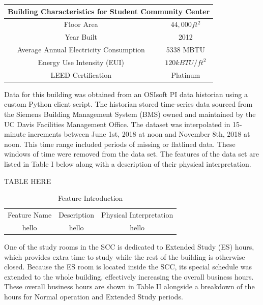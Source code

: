 \documentclass[letterpaper, 12 pt, conference]{ieeeconf}  %
\begin{document}
\begin{table}[H]
        \centering
        \begin{tabular}{cc}
        \toprule
        \multicolumn{2}{c}{Building Characteristics for Student Community Center}
        \\ \midrule
        Floor Area                             & $44,000ft^2$    \\
        Year Built                             & 2012            \\
        Average Annual Electricity Consumption & 5338 MBTU       \\
        Energy Use Intensity (EUI)             & $120 kBTU/ft^2$ \\ 
        LEED Certification                     & Platinum        \\
        \bottomrule
        \end{tabular}
\end{table}

Data for this building was obtained from an OSIsoft PI data historian using a custom Python client script. The historian stored time-series data sourced from the Siemens Building Management System (BMS) owned and maintained by the UC Davis Facilities Management Office. The dataset was interpolated in 15-minute increments between June 1st, 2018 at noon and November 8th, 2018 at noon. This time range included periods of missing or flatlined data. These windows of time were removed from the data set. The features of the data set are listed in Table I below along with a description of their physical interpretation.

\mbox{}

TABLE HERE
\begin{table}[H]
        \centering
        \caption{Feature Introduction}
        \begin{tabularx}{0.5\textwidth}{ccc}
                \toprule
                Feature Name & Description & Physical Interpretation \\
                \cmidrule(r){1-1} \cmidrule(r){2-2} \cmidrule(r){3-3}
                hello & hello & hello \\
                \bottomrule
        \end{tabularx}
\end{table}

\mbox{}

One of the study rooms in the SCC is dedicated to Extended Study (ES) hours, which provides extra time to study while the rest of the building is otherwise closed. Because the ES room is located inside the SCC, its special schedule was extended to the whole building, effectively increasing the overall business hours. These overall business hours are shown in Table II alongside a breakdown of the hours for Normal operation and Extended Study periods.
\end{document}
